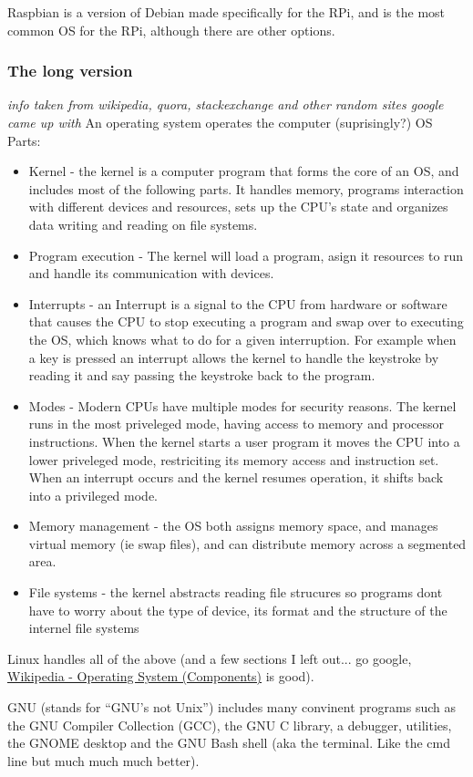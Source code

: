 \documentclass[11pt, titlepage]{article}
\begin{document}
Raspbian is a version of Debian made specifically for the RPi, and is the most common OS for the RPi, although there are other options.
\subsubsection{The long version}
\textit{info taken from wikipedia, quora, stackexchange and other random sites google came up with}
An operating system operates the computer (suprisingly?)
OS Parts:
\begin{itemize}
	\item Kernel - the kernel is a computer program that forms the core of an OS, and includes most of the following parts. It handles memory, programs interaction with different devices and resources, sets up the CPU's state and organizes data writing and reading on file systems.
	\item Program execution - The kernel will load a program, asign it resources to run and handle its communication with devices.
	\item Interrupts - an Interrupt is a signal to the CPU from hardware or software that causes the CPU to stop executing a program and swap over to executing the OS, which knows what to do for a given interruption. For example when a key is pressed an interrupt allows the kernel to handle the keystroke by reading it and say passing the keystroke back to the program.
	\item Modes - Modern CPUs have multiple modes for security reasons. The kernel runs in the most priveleged mode, having access to memory and processor instructions. When the kernel starts a user program it moves the CPU into a lower priveleged mode, restriciting its memory access and instruction set. When an interrupt occurs and the kernel resumes operation, it shifts back into a privileged mode.
	\item Memory management - the OS both assigns memory space, and manages virtual memory (ie swap files), and can distribute memory across a segmented area.
	\item File systems - the kernel abstracts reading file strucures so programs dont have to worry about the type of device, its format and the structure of the internel file systems
\end{itemize}
Linux handles all of the above (and a few sections I left out... go google, \href{https://en.wikipedia.org/wiki/Operating_system#Components}{Wikipedia - Operating System (Components)} is good).

GNU (stands for ``GNU's not Unix'') includes many convinent programs such as the GNU Compiler Collection (GCC), the GNU C library, a debugger, utilities, the GNOME desktop and the GNU Bash shell (aka the terminal. Like the cmd line but much much much better).
\end{document}
